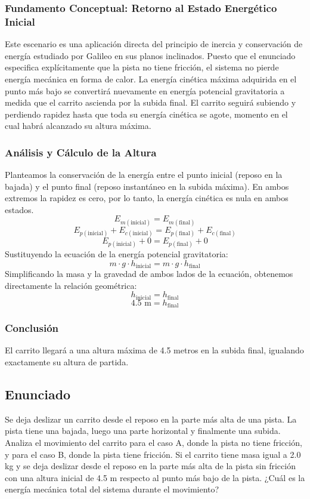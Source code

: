 \documentclass[12pt,a4paper]{article}
\begin{document}
\subsubsection*{Fundamento Conceptual: Retorno al Estado Energético Inicial}
Este escenario es una aplicación directa del principio de inercia y conservación de energía estudiado por Galileo en sus planos inclinados. Puesto que el enunciado especifica explícitamente que la pista no tiene fricción, el sistema no pierde energía mecánica en forma de calor. La energía cinética máxima adquirida en el punto más bajo se convertirá nuevamente en energía potencial gravitatoria a medida que el carrito ascienda por la subida final. El carrito seguirá subiendo y perdiendo rapidez hasta que toda su energía cinética se agote, momento en el cual habrá alcanzado su altura máxima. 

\subsubsection*{Análisis y Cálculo de la Altura}
Planteamos la conservación de la energía entre el punto inicial (reposo en la bajada) y el punto final (reposo instantáneo en la subida máxima). En ambos extremos la rapidez es cero, por lo tanto, la energía cinética es nula en ambos estados.
$$E_{m(\text{inicial})} = E_{m(\text{final})}$$
$$E_{p(\text{inicial})} + E_{c(\text{inicial})} = E_{p(\text{final})} + E_{c(\text{final})}$$
$$E_{p(\text{inicial})} + 0 = E_{p(\text{final})} + 0$$
Sustituyendo la ecuación de la energía potencial gravitatoria:
$$m \cdot g \cdot h_{\text{inicial}} = m \cdot g \cdot h_{\text{final}}$$
Simplificando la masa y la gravedad de ambos lados de la ecuación, obtenemos directamente la relación geométrica:
$$h_{\text{inicial}} = h_{\text{final}}$$
$$4.5 \text{ m} = h_{\text{final}}$$

\subsubsection*{Conclusión}
El carrito llegará a una altura máxima de 4.5 metros en la subida final, igualando exactamente su altura de partida.

\newpage
\subsection*{Enunciado}
Se deja deslizar un carrito desde el reposo en la parte más alta de una pista. La pista tiene una bajada, luego una parte horizontal y finalmente una subida. Analiza el movimiento del carrito para el caso A, donde la pista no tiene fricción, y para el caso B, donde la pista tiene fricción. Si el carrito tiene masa igual a 2.0 kg y se deja deslizar desde el reposo en la parte más alta de la pista sin fricción con una altura inicial de 4.5 m respecto al punto más bajo de la pista. ¿Cuál es la energía mecánica total del sistema durante el movimiento?
\end{document}
